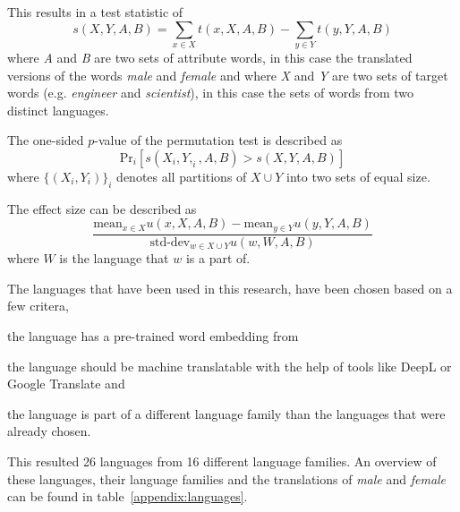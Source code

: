 This results in a test statistic of
$$
s(X,Y,A,B) = \displaystyle\sum_{x \in X}t(x,X,A,B) - \displaystyle\sum_{y \in Y}t(y,Y,A,B)
$$
where \textit{A} and \textit{B} are two sets of attribute words, in this case the
translated versions of the words \textit{male} and
\textit{female} and where \textit{X} and \textit{Y} are two sets of target words
(e.g. \textit{engineer} and \textit{scientist}), in this case the sets of words from
two distinct languages. 

The one-sided $p$-value of the permutation test is described as
$$
\text{Pr}_i[s(X_i, Y,_i, A, B) > s(X,Y,A,B)]
$$
where $\{(X_i, Y_i)\}_i$ denotes all partitions of $X \cup Y$ into two sets of equal 
size.

The effect size can be described as
$$
\frac{
    \text{mean}_{x \in X} u(x, X, A, B) - \text{mean}_{y \in Y} u(y, Y, A, B)
}{
    \text{std-dev}_{w \in X \cup Y} u(w,W,A,B)
}
$$
where $W$ is the language that $w$ is a part of.


The languages that have been used in this research, have been chosen based on a
few critera,
\begin{seriate}
    \item the language has a pre-trained word embedding from \textcite{grave2018learning}
    \item the language should be machine translatable with the help of tools like DeepL or
    Google Translate and
    \item the language is part of a different language family than the languages that
    were already chosen.
\end{seriate}
This resulted 26 languages from 16 different language families. An overview of these languages, their language families and the translations of \textit{male} and \textit{female}
can be found in table~\ref{appendix:languages}.
